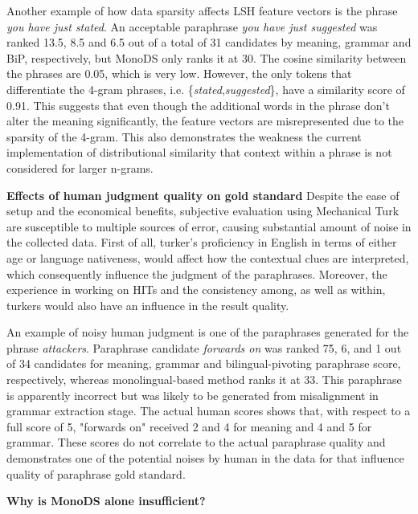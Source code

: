 \documentclass[11pt]{article}
\newcommand{\mnote}[1]{\marginpar{\raggedleft\footnotesize\itshape#1}}
\begin{document}
{{\mnote{example of sparsity problem} %
Another example of how data sparsity affects LSH feature vectors is the phrase \emph{you have just stated}. An acceptable paraphrase \emph{you have just suggested} was ranked 13.5, 8.5 and 6.5 out of a total of 31 candidates by meaning, grammar and BiP, respectively, but MonoDS only ranks it at 30. The cosine similarity between the phrases are 0.05, which is very low. However, the only tokens that differentiate the 4-gram phrases, i.e. \{\emph{stated},\emph{suggested}\}, have a similarity score of 0.91. This suggests that even though the additional words in the phrase don't alter the meaning significantly, the feature vectors are misrepresented due to the sparsity of the 4-gram. This also demonstrates the weakness the current implementation of distributional similarity that context within a phrase is not considered for larger n-grams.



{\bf Effects of human judgment quality on gold standard}
Despite the ease of setup and the economical benefits, subjective evaluation using Mechanical Turk are susceptible to multiple sources of error, causing substantial amount of noise in the collected data. First of all, turker's proficiency in English in terms of either age or language nativeness, would affect how the contextual clues are interpreted, which consequently influence the judgment of the paraphrases. Moreover, the experience in working on HITs and the consistency among, as well as within, turkers would also have an influence in the result quality. 

An example of noisy human judgment is one of the paraphrases generated for the phrase \emph{attackers}. Paraphrase candidate \emph{forwards on} was ranked 7\.5, 6, and 1 out of 34 candidates for meaning, grammar and bilingual-pivoting paraphrase score, respectively, whereas monolingual-based method ranks it at 33. This paraphrase is apparently incorrect but was likely to be generated from misalignment in grammar extraction stage. The actual human scores shows that, with respect to a full score of 5, "forwards on" received 2 and 4 for meaning and 4 and 5 for grammar. These scores do not correlate to the actual paraphrase quality and demonstrates one of the potential noises by human in the data for that influence quality of paraphrase gold standard.


{\bf Why is MonoDS alone insufficient?}

}}
\end{document}
